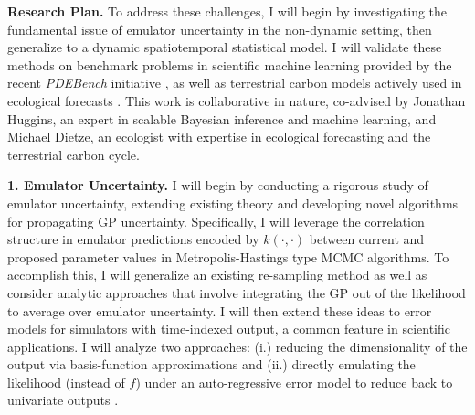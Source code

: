\documentclass[11pt]{article}
\begin{document}

\noindent
\textbf{Research Plan.} To address these challenges, I will begin by investigating the fundamental issue of emulator uncertainty in the 
non-dynamic setting, then generalize to a dynamic spatiotemporal statistical model. I will validate these methods on benchmark problems in scientific machine learning provided by the recent \textit{PDEBench} initiative \cite{Takamoto}, as well as terrestrial carbon models actively used in ecological forecasts \cite{Dietze}. This work is collaborative in nature, co-advised by Jonathan Huggins, an expert in scalable Bayesian inference and machine learning, and Michael Dietze, an ecologist with expertise in ecological forecasting and the terrestrial carbon cycle. 

 \textbf{1. Emulator Uncertainty.} I will begin by conducting a rigorous study of emulator uncertainty, extending existing theory \cite{Tuo} and developing novel algorithms for propagating GP uncertainty. Specifically, I will leverage the correlation structure in emulator predictions encoded by $k(\cdot, \cdot)$ between current and proposed parameter values in Metropolis-Hastings type MCMC algorithms. To accomplish this, I will generalize an existing re-sampling method \cite{Fer} as well as consider analytic approaches that involve integrating the GP out of the likelihood to average over emulator uncertainty. 
I will then extend these ideas to error models for simulators with time-indexed output, a common feature in scientific applications. I will analyze two approaches: (i.) reducing the dimensionality of the output via basis-function 
 approximations and (ii.) directly emulating the likelihood (instead of $f$) under an auto-regressive error model to reduce back to univariate outputs \cite{Fer}. 
\end{document}
